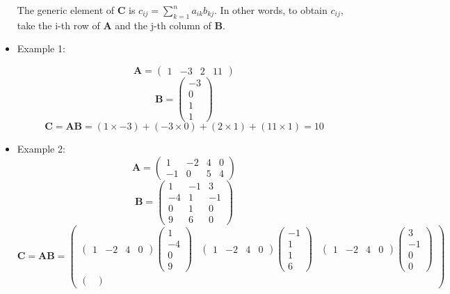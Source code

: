 \documentclass[11pt]{article}
\theoremstyle{definition}
\theoremstyle{remark}
\begin{document}
\begin{itemize}
The generic element of \textbf{C} is $c_{ij} = \sum_{k=1}^n a_{ik}b_{kj}$. In other words, to obtain $c_{ij}$, take the i-th row of \textbf{A} and the j-th column of \textbf{B}.
\item Example 1: 

$$
\mathbf{A} =
\begin{pmatrix}
1&-3&2&11
\end{pmatrix}
$$
$$
\textbf{B} =
\begin{pmatrix}
-3 \\
0 \\
1 \\
1
\end{pmatrix}
$$
$$
\textbf{C} = \textbf{AB} = 
(1 \times -3) + (-3 \times 0) + (2  \times 1) + (11 \times 1) = 10
$$

\item Example 2:
$$
\mathbf{A} =
\begin{pmatrix}
1&-2&4&0 \\
-1&0&5&4
\end{pmatrix}
$$
$$
\textbf{B} =
\begin{pmatrix}
1&-1&3 \\
-4&1&-1 \\
0&1&0 \\
9&6&0
\end{pmatrix}
$$
$$
\textbf{C} = \textbf{AB} = 
\begin{pmatrix}
\begin{pmatrix} 
1&-2&4&0
\end{pmatrix}\begin{pmatrix}
1 \\
-4 \\
0 \\
9
\end{pmatrix}&\begin{pmatrix} 
1&-2&4&0
\end{pmatrix}\begin{pmatrix}
-1 \\
1 \\
1 \\
6
\end{pmatrix}&\begin{pmatrix} 
1&-2&4&0
\end{pmatrix}\begin{pmatrix}
3 \\
-1 \\
0 \\
0
\end{pmatrix} \\
\begin{pmatrix} 

\end{pmatrix}
\end{pmatrix}$$
\end{itemize}
\end{document}

